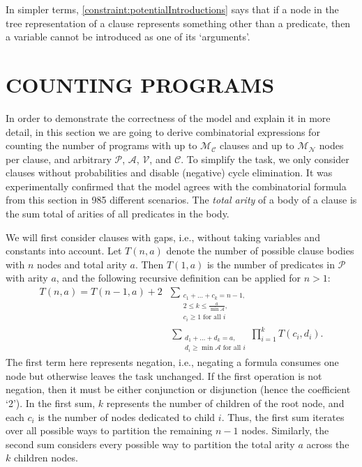 \documentclass[letterpaper]{article}
\theoremstyle{definition}
\newcommand{\predicates}{\mathcal{P}}
\newcommand{\variables}{\mathcal{V}}
\newcommand{\constants}{\mathcal{C}}
\newcommand{\arities}{\mathcal{A}}
\newcommand{\maxNumNodes}{\mathcal{M}_{\mathcal{N}}}
\newcommand{\maxNumClauses}{\mathcal{M}_{\mathcal{C}}}
\begin{document}
In simpler terms, \cref{constraint:potentialIntroductions} says that if a node
in the tree representation of a clause represents something other than a
predicate, then a variable cannot be introduced as one of its `arguments'.

\section{COUNTING PROGRAMS}

In order to demonstrate the correctness of the model and explain it in more
detail, in this section we are going to derive combinatorial expressions for
counting the number of programs with up to $\maxNumClauses{}$ clauses and up to
$\maxNumNodes{}$ nodes per clause, and arbitrary $\predicates{}$,
$\arities{}$, $\variables{}$, and $\constants{}$. To simplify the task, we only
consider clauses without probabilities and disable (negative) cycle elimination.
It was experimentally confirmed that the model agrees with the combinatorial
formula from this section in 985 different scenarios. The \emph{total arity} of
a body of a clause is the sum total of arities of all predicates in the body.

We will first consider clauses with gaps, i.e., without taking variables and
constants into account. Let $T(n, a)$ denote the number of possible clause
bodies with $n$ nodes and total arity $a$. Then $T(1, a)$ is the number of
predicates in $\predicates{}$ with arity $a$, and the following recursive
definition can be applied for $n > 1$:
\begin{align*}
  T(n, a) = T(n-1, a) + 2&\sum_{\substack{c_1 + \dots + c_k = n - 1,\\
      2 \le k \le \frac{a}{\min \arities{}},\\
  c_i \ge 1 \text{ for all } i}}\\
  &\sum_{\substack{d_1 + \dots + d_k = a,\\
  d_i \ge \min \arities{} \text{ for all } i}} \prod_{i=1}^k T(c_i, d_i).
\end{align*}
The first term here represents negation, i.e., negating a formula consumes
one node but otherwise leaves the task unchanged. If the first operation is not
negation, then it must be either conjunction or disjunction (hence the
coefficient `2'). In the first sum, $k$ represents the number of children of the
root node, and each $c_i$ is the number of nodes dedicated to child $i$. Thus,
the first sum iterates over all possible ways to partition the remaining $n-1$
nodes. Similarly, the second sum considers every possible way to partition the
total arity $a$ across the $k$ children nodes.
\end{document}
